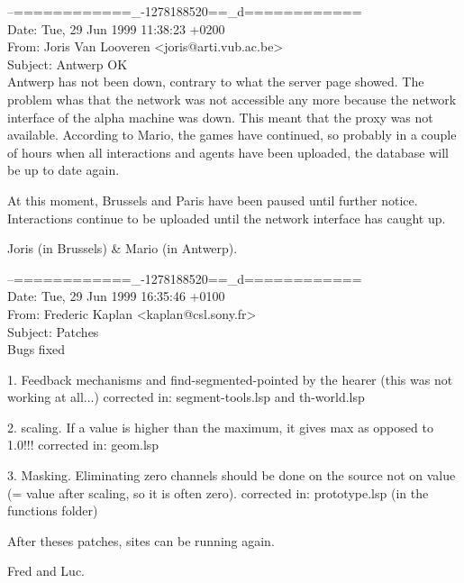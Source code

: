 \begin{mail}
--============\_-1278188520==\_d============\\
Date: Tue, 29 Jun 1999 11:38:23 +0200\\
From: Joris Van Looveren <joris@arti.vub.ac.be>\\
Subject: Antwerp OK\\

Antwerp has not been down, contrary to what the server page showed. The
problem whas that the network was not accessible any more because the
network interface of the alpha machine was down. This meant that the
proxy was not available. According to Mario, the games have continued,
so probably in a couple of hours when all interactions and agents have
been uploaded, the database will be up to date again. 

At this moment, Brussels and Paris have been paused until further
notice. Interactions continue to be uploaded until the network interface
has caught up.

Joris (in Brussels) \& Mario (in Antwerp).
\end{mail}

\begin{mail}
--============\_-1278188520==\_d============\\
Date: Tue, 29 Jun 1999 16:35:46 +0100\\
From: Frederic Kaplan <kaplan@csl.sony.fr>\\
Subject: Patches\\

Bugs fixed

1. Feedback mechanisms and find-segmented-pointed by the hearer (this
was not working at all...) corrected in: segment-tools.lsp and th-world.lsp

2. scaling. If a value is higher than the maximum, it gives max as opposed to
1.0!!! corrected in: geom.lsp

3. Masking. Eliminating zero channels should be done on the source not on
value (= value after scaling, so it is often zero). corrected in: 
prototype.lsp (in the functions folder)

After theses patches, sites can be running again.

Fred and Luc.
\end{mail}

\newpage

